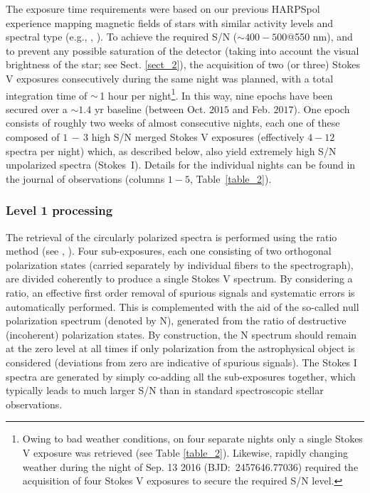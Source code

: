 \documentclass[a4paper,fleqn,usenatbib]{mnras}
\begin{document}
The exposure time requirements were based on our previous HARPSpol experience mapping magnetic fields of stars with similar activity levels and spectral type (e.g., , ). To achieve the required S/N ($\sim$$400-500$@550 nm), and to prevent any possible saturation of the detector (taking into account the visual brightness of the star; see Sect. \ref{sect_2}), the acquisition of two (or three) Stokes V exposures consecutively during the same night was planned, with a total integration time of $\sim$\,1 hour per night\footnote[4]{Owing to bad weather conditions, on four separate nights only a single Stokes V exposure was retrieved (see Table \ref{table_2}). Likewise, rapidly changing weather during the night of Sep. 13 2016 (BJD:~2457646.77036) required the acquisition of four Stokes V exposures to secure the required S/N level.}. In this way, nine epochs have been secured over a $\sim$$1.4$ yr baseline (between Oct. $2015$ and Feb. $2017$). One epoch consists of roughly two weeks of almost consecutive nights, each one of these composed of $1$$\,-\,$$3$ high S/N merged Stokes V exposures (effectively $4-12$ spectra per night) which, as described below, also yield extremely high S/N unpolarized spectra (Stokes~I). Details for the individual nights can be found in the journal of observations (columns $1-5$, Table~\ref{table_2}).

\subsubsection{Level 1 processing}\label{lv1}

The retrieval of the circularly polarized spectra is performed using the ratio method (see , ). Four sub-exposures, each one consisting of two orthogonal polarization states (carried separately by individual fibers to the spectrograph), are divided coherently to produce a single Stokes V spectrum. By considering a ratio, an effective first order removal of spurious signals and systematic errors is automatically performed. This is complemented with the aid of the so-called null polarization spectrum (denoted by N), generated from the ratio of destructive (incoherent) polarization states. By construction, the N spectrum should remain at the zero level at all times if only polarization from the astrophysical object is considered (deviations from zero are indicative of spurious signals). The Stokes I spectra are generated by simply co-adding all the sub-exposures together, which typically leads to much larger S/N than in standard spectroscopic stellar observations.
\end{document}
